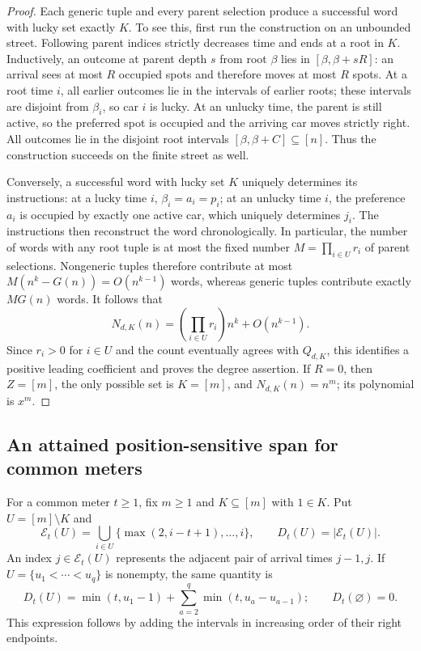 \documentclass[11pt,a4paper]{article}
\begin{document}
\begin{proof}
Each generic tuple and every parent selection produce a successful word
with lucky set exactly $K$.  To see this, first run the construction on an
unbounded street.  Following parent indices strictly decreases time and
ends at a root in $K$.  Inductively, an outcome at parent depth $s$ from
root $\beta$ lies in $[\beta,\beta+sR]$: an arrival sees at most $R$
occupied spots and therefore moves at most $R$ spots.  At a root time
$i$, all earlier outcomes lie in the intervals of earlier roots; these
intervals are disjoint from $\beta_i$, so car $i$ is lucky.  At an
unlucky time, the parent is still active, so the preferred spot is
occupied and the arriving car moves strictly right.  All outcomes lie
in the disjoint root intervals $[\beta,\beta+C]\subseteq[n]$.
Thus the construction succeeds on the finite street as well.

Conversely, a successful word with lucky set $K$ uniquely determines its
instructions: at a lucky time $i$, $\beta_i=a_i=p_i$; at an unlucky time
$i$, the preference $a_i$ is occupied by exactly one active car, which
uniquely determines $j_i$.  The instructions then reconstruct the word
chronologically.  In particular, the number of words with any root
tuple is at most the fixed number $M=\prod_{i\in U}r_i$ of parent
selections.  Nongeneric tuples therefore contribute at most
$M(n^k-G(n))=O(n^{k-1})$ words, whereas generic tuples contribute
exactly $MG(n)$ words.  It follows that
\[
 N_{d,K}(n)=\left(\prod_{i\in U}r_i\right)n^k+O(n^{k-1}).
\]
Since $r_i>0$ for $i\in U$ and the count eventually agrees with
$Q_{d,K}$, this identifies a positive leading coefficient and proves
the degree assertion.  If $R=0$, then $Z=[m]$, the only possible set
is $K=[m]$, and $N_{d,K}(n)=n^m$; its polynomial is $x^m$.
\end{proof}

\subsection{An attained position-sensitive span for common meters}

For a common meter $t\ge1$, fix $m\ge1$ and $K\subseteq[m]$ with $1\in K$.
Put $U=[m]\setminus K$ and
\[
 \mathcal E_t(U)=\bigcup_{i\in U}\{\max(2,i-t+1),\ldots,i\},
 \qquad D_t(U)=|\mathcal E_t(U)|.
\]
An index $j\in\mathcal E_t(U)$ represents the adjacent pair of arrival
times $j-1,j$.  If $U=\{u_1<\cdots<u_q\}$ is nonempty, the same quantity is
\[
 D_t(U)=\min(t,u_1-1)+\sum_{a=2}^{q}\min(t,u_a-u_{a-1});
 \qquad D_t(\varnothing)=0.
\]
This expression follows by adding the intervals in increasing order of
their right endpoints.
\end{document}
